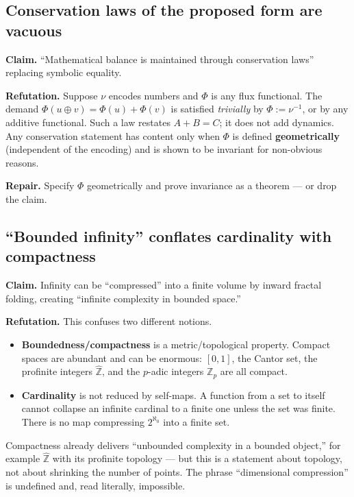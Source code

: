 \documentclass[11pt]{article}
\begin{document}
\subsection{Conservation laws of the proposed form are vacuous}

\textbf{Claim.} ``Mathematical balance is maintained through conservation laws''
replacing symbolic equality.

\noindent\textbf{Refutation.} Suppose $\nu$ encodes numbers and $\Phi$ is any flux
functional. The demand $\Phi(u\oplus v)=\Phi(u)+\Phi(v)$ is satisfied
\emph{trivially} by $\Phi := \nu^{-1}$, or by any additive functional. Such a law
restates $A+B=C$; it does not add dynamics. Any conservation statement has content
only when $\Phi$ is defined \textbf{geometrically} (independent of the encoding)
and is shown to be invariant for non-obvious reasons.

\noindent\textbf{Repair.} Specify $\Phi$ geometrically and prove invariance as a
theorem --- or drop the claim.

\subsection{``Bounded infinity'' conflates cardinality with compactness}

\textbf{Claim.} Infinity can be ``compressed'' into a finite volume by inward
fractal folding, creating ``infinite complexity in bounded space.''

\noindent\textbf{Refutation.} This confuses two different notions.

\begin{itemize}[leftmargin=1.4em]
\item \textbf{Boundedness/compactness} is a metric/topological property. Compact
spaces are abundant and can be enormous: $[0,1]$, the Cantor set, the profinite
integers $\hat{\mathbb{Z}}$, and the $p$-adic integers $\mathbb{Z}_p$ are all
compact.
\item \textbf{Cardinality} is not reduced by self-maps. A function from a set to
itself cannot collapse an infinite cardinal to a finite one unless the set was
finite. There is no map compressing $2^{\aleph_0}$ into a finite set.
\end{itemize}

Compactness already delivers ``unbounded complexity in a bounded object,'' for
example $\hat{\mathbb{Z}}$ with its profinite topology --- but this is a statement
about topology, not about shrinking the number of points. The phrase
``dimensional compression'' is undefined and, read literally, impossible.
\end{document}
